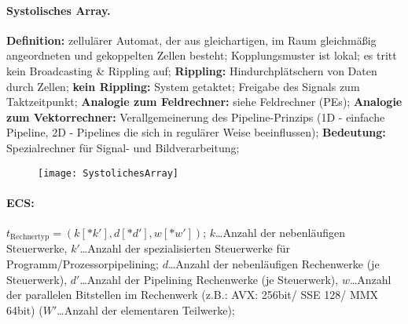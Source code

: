 \documentclass[8pt,a4paper]{article}
\begin{document}
\begin{multicols}{2}
\paragraph{Systolisches Array.} \textbf{Definition:} zellulärer Automat, der aus
gleichartigen, im Raum gleichmäßig angeordneten und gekoppelten Zellen
besteht; Kopplungsmuster ist lokal; es tritt kein Broadcasting \&
Rippling auf; \textbf{Rippling:} Hindurchplätschern von Daten durch
Zellen; \textbf{kein Rippling:} System getaktet; Freigabe des Signals
zum Taktzeitpunkt; \textbf{Analogie zum Feldrechner:} siehe
Feldrechner (PEs); \textbf{Analogie zum Vektorrechner:}
Verallgemeinerung des Pipeline-Prinzips (1D - einfache Pipeline, 2D -
Pipelines die sich in regulärer Weise beeinflussen);
\textbf{Bedeutung:} Spezialrechner für Signal- und Bildverarbeitung;
\begin{figure}[H]
  \centering
\texttt{[image: SystolichesArray]}
\end{figure}

\paragraph{ECS:} $t_{\text{Rechnertyp}}=(k[*k'],d[*d'],w[*w'])$; $k$\ldots Anzahl der nebenläufigen Steuerwerke, $k'$\ldots Anzahl der spezialisierten Steuerwerke für Programm/Prozessorpipelining; $d$\ldots Anzahl der nebenläufigen Rechenwerke (je Steuerwerk), $d'$\ldots Anzahl der Pipelining Rechenwerke (je Steuerwerk), $w$\ldots Anzahl der parallelen Bitstellen im Rechenwerk (z.B.: AVX: 256bit/ SSE 128/ MMX 64bit) ($W'$\ldots Anzahl der elementaren Teilwerke);


\end{multicols}
\end{document}

